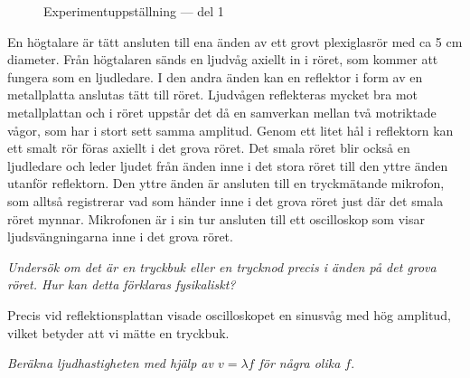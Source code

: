 \documentclass[a4paper,12pt]{article}  %
\begin{document}
\begin{figure}[h]
\centering
{}
\caption{Experimentuppställning --- del 1}%
\label{fig:uppställning_1}
\end{figure}

\begin{displayquote}
En högtalare är tätt ansluten till ena änden av ett grovt plexiglasrör med ca 5
cm diameter. Från högtalaren sänds en ljudvåg axiellt in i röret, som kommer att
fungera som en ljudledare. I den andra änden kan en reflektor i form av en
metallplatta anslutas tätt till röret. Ljudvågen reflekteras mycket bra mot
metallplattan och i röret uppstår det då en samverkan mellan två motriktade
vågor, som har i stort sett samma amplitud. Genom ett litet hål i reflektorn kan
ett smalt rör föras axiellt i det grova röret. Det smala röret blir också en
ljudledare och leder ljudet från änden inne i det stora röret till den yttre
änden utanför reflektorn. Den yttre änden är ansluten till en tryckmätande
mikrofon, som alltså registrerar vad som händer inne i det grova röret just där
det smala röret mynnar. Mikrofonen är i sin tur ansluten till ett oscilloskop
som visar ljudsvängningarna inne i det grova röret.
\end{displayquote}


\emph{Undersök om det är en tryckbuk eller en trycknod precis i änden på det
  grova röret. Hur kan detta förklaras fysikaliskt?}

Precis vid reflektionsplattan visade oscilloskopet en sinusvåg med hög amplitud,
vilket betyder att vi mätte en tryckbuk. %

\emph{Beräkna ljudhastigheten med hjälp av $v = \lambda f$ för några olika $f$}.
\end{document}
